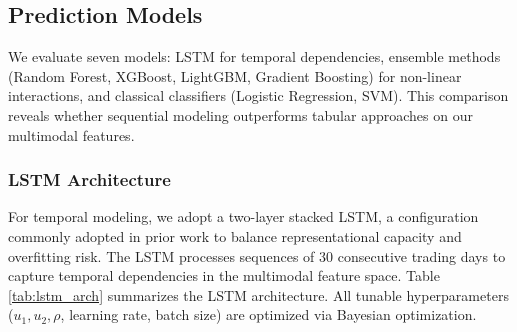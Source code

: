 \documentclass[a4paper,10pt,conference]{IEEEtran}
\begin{document}
\subsection{Prediction Models}

We evaluate seven models: LSTM for temporal dependencies, ensemble methods (Random Forest, XGBoost, LightGBM, Gradient Boosting) for non-linear interactions, and classical classifiers (Logistic Regression, SVM). This comparison reveals whether sequential modeling outperforms tabular approaches on our multimodal features.

\subsubsection{LSTM Architecture}

For temporal modeling, we adopt a two-layer stacked LSTM, a configuration commonly adopted in prior work \cite{hochreiter1997}  \cite {fischer2018} to balance representational capacity and overfitting risk. The LSTM processes sequences of 30 consecutive trading days to capture temporal dependencies in the multimodal feature space. 
Table \ref{tab:lstm_arch} summarizes the LSTM architecture. All tunable hyperparameters ($u_1, u_2, \rho$, learning rate, batch size) are optimized via Bayesian optimization.

\begin{table}[h]
\caption{LSTM Network Architecture}
\label{tab:lstm_arch}
\centering
{}
\end{table}
\end{document}

